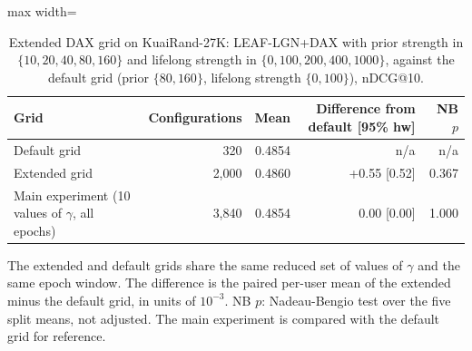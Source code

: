 \begin{table}[tbp]
\centering
\footnotesize
\caption{Extended DAX grid on KuaiRand-27K: LEAF-LGN+DAX with prior strength in $\{10,20,40,80,160\}$ and lifelong strength in $\{0,100,200,400,1000\}$, against the default grid (prior $\{80,160\}$, lifelong strength $\{0,100\}$), nDCG@10.}
\label{tab:extgrid}
\begin{adjustbox}{max width=\linewidth}
\begin{tabular}{lrrrr}
\toprule
Grid & Configurations & Mean & Difference from default [95\% hw] & NB $p$ \\
\midrule
Default grid & 320 & 0.4854 & n/a & n/a \\
Extended grid & 2,000 & 0.4860 & +0.55 [0.52] & 0.367 \\
Main experiment (10 values of $\gamma$, all epochs) & 3,840 & 0.4854 & 0.00 [0.00] & 1.000 \\
\bottomrule
\end{tabular}
\end{adjustbox}
\par\smallskip
\begin{minipage}{\linewidth}\raggedright\footnotesize The extended and default grids share the same reduced set of values of $\gamma$ and the same epoch window. The difference is the paired per-user mean of the extended minus the default grid, in units of $10^{-3}$. NB $p$: Nadeau-Bengio test over the five split means, not adjusted. The main experiment is compared with the default grid for reference.\end{minipage}
\end{table}
